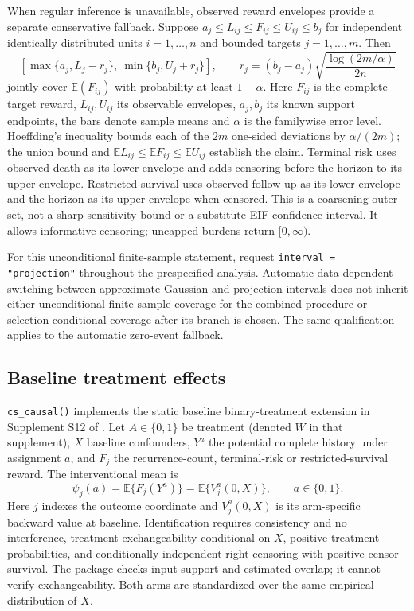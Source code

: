 \documentclass[article,nojss]{jss}
\newcommand{\code}[1]{\texttt{#1}}
\providecommand{\E}{\mathsf{E}}
\renewcommand{\E}{\mathbb{E}}
\begin{document}
When regular inference is unavailable, observed reward envelopes provide a separate conservative fallback. Suppose $a_j\leq L_{ij}\leq F_{ij}\leq U_{ij}\leq b_j$ for independent identically distributed units $i=1,\ldots,n$ and bounded targets $j=1,\ldots,m$. Then
\begin{equation}\label{eq:outer_envelope}
 \left[\max\{a_j,\overline L_j-r_j\},\ \min\{b_j,\overline U_j+r_j\}\right],\qquad
 r_j=(b_j-a_j)\sqrt{\frac{\log(2m/\alpha)}{2n}}
\end{equation}
jointly cover $\E(F_{ij})$ with probability at least $1-\alpha$. Here $F_{ij}$ is the complete target reward, $L_{ij},U_{ij}$ its observable envelopes, $a_j,b_j$ its known support endpoints, the bars denote sample means and $\alpha$ is the familywise error level. Hoeffding's inequality \citep{Hoeffding1963} bounds each of the $2m$ one-sided deviations by $\alpha/(2m)$; the union bound and $\E L_{ij}\leq\E F_{ij}\leq\E U_{ij}$ establish the claim. Terminal risk uses observed death as its lower envelope and adds censoring before the horizon to its upper envelope. Restricted survival uses observed follow-up as its lower envelope and the horizon as its upper envelope when censored. This is a coarsening outer set, not a sharp sensitivity bound or a substitute EIF confidence interval. It allows informative censoring; uncapped burdens return $[0,\infty)$.

For this unconditional finite-sample statement, request \code{interval = "projection"} throughout the prespecified analysis. Automatic data-dependent switching between approximate Gaussian and projection intervals does not inherit either unconditional finite-sample coverage for the combined procedure or selection-conditional coverage after its branch is chosen. The same qualification applies to the automatic zero-event fallback.


\subsection{Baseline treatment effects}\label{sec:causal}
\code{cs\_causal()} implements the static baseline binary-treatment extension in Supplement S12 of \citet{Adetunji2026}. Let $A\in\{0,1\}$ be treatment (denoted $W$ in that supplement), $X$ baseline confounders, $Y^a$ the potential complete history under assignment $a$, and $F_j$ the recurrence-count, terminal-risk or restricted-survival reward. The interventional mean is
\begin{equation}\label{eq:causal_mean}
 \psi_j(a)=\E\{F_j(Y^a)\}=\E\{V_j^a(0,X)\},\qquad a\in\{0,1\}.
\end{equation}
Here $j$ indexes the outcome coordinate and $V_j^a(0,X)$ is its arm-specific backward value at baseline. Identification requires consistency and no interference, treatment exchangeability conditional on $X$, positive treatment probabilities, and conditionally independent right censoring with positive censor survival. The package checks input support and estimated overlap; it cannot verify exchangeability. Both arms are standardized over the same empirical distribution of $X$.
\end{document}
